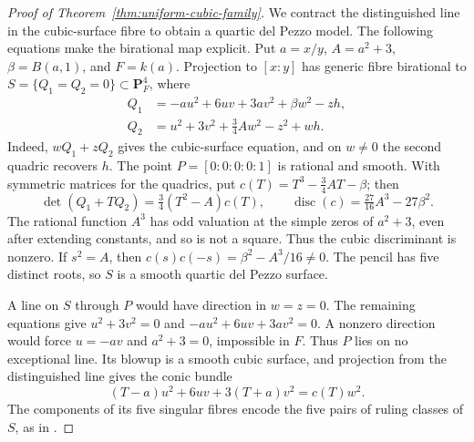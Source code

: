 \documentclass[11pt]{article}
\theoremstyle{remark}
\newcommand{\PP}{\mathbf P}
\begin{document}
\begin{proof}[Proof of Theorem~\ref{thm:uniform-cubic-family}]
We contract the distinguished line in the cubic-surface fibre to obtain a
quartic del Pezzo model. The following equations make the birational map
explicit.
Put \(a=x/y\), \(A=a^2+3\), \(\beta=B(a,1)\), and \(F=k(a)\).
Projection to \([x:y]\) has generic fibre birational to
\(S=\{Q_1=Q_2=0\}\subset\PP^4_F\), where
\begin{align}
 Q_1&=-au^2+6uv+3av^2+\beta w^2-zh,\nonumber\\
 Q_2&=u^2+3v^2+\tfrac34Aw^2-z^2+wh.
 \label{eq:family-quadrics}
\end{align}
Indeed, \(wQ_1+zQ_2\) gives the cubic-surface equation, and on
\(w\ne0\) the second quadric recovers \(h\). The point
\(P=[0:0:0:0:1]\) is rational and smooth. With symmetric matrices for
the quadrics, put \(c(T)=T^3-\tfrac34AT-\beta\); then
\begin{equation}
 \det(Q_1+TQ_2)=\tfrac34(T^2-A)c(T),\qquad
 \operatorname{disc}(c)=\tfrac{27}{16}A^3-27\beta^2.
 \label{eq:family-determinant}
\end{equation}
The rational function \(A^3\) has odd valuation at the simple zeros of
\(a^2+3\), even after extending constants, and so is not a square.
Thus the cubic discriminant is nonzero. If \(s^2=A\), then
\(c(s)c(-s)=\beta^2-A^3/16\ne0\). The pencil has five distinct roots,
so \(S\) is a smooth quartic del Pezzo surface.

A line on \(S\) through \(P\) would have direction in \(w=z=0\).
The remaining equations give
\(u^2+3v^2=0\) and \(-au^2+6uv+3av^2=0\).
A nonzero direction would force \(u=-av\) and \(a^2+3=0\), impossible
in \(F\). Thus \(P\) lies on no exceptional line. Its blowup is a smooth
cubic surface, and projection from the distinguished line gives the conic
bundle
\begin{equation}
 (T-a)u^2+6uv+3(T+a)v^2=c(T)w^2.
 \label{eq:family-conic-bundle}
\end{equation}
The components of its five singular fibres encode the five pairs of ruling
classes of \(S\), as in \cite[Section~4]{TZ}.


\end{proof}
\end{document}
